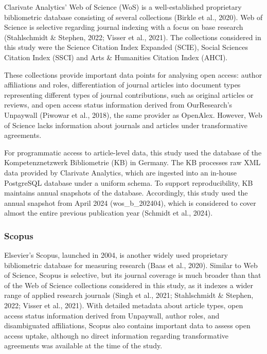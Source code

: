 \documentclass[a4paper,man,floatsintext,longtable,noextraspace,10pt]{apa6}
\begin{document}
Clarivate Analytics' Web of Science (WoS) is a well-established
proprietary bibliometric database consisting of several collections
(Birkle et al., 2020). Web of Science is selective regarding journal
indexing with a focus on base research (Stahlschmidt \& Stephen, 2022;
Visser et al., 2021). The collections considered in this study were the
Science Citation Index Expanded (SCIE), Social Sciences Citation Index
(SSCI) and Arts \& Humanities Citation Index (AHCI).

These collections provide important data points for analysing open
access: author affiliations and roles, differentiation of journal
articles into document types representing different types of journal
contributions, such as original articles or reviews, and open access
status information derived from OurResearch's Unpaywall (Piwowar et al.,
2018), the same provider as OpenAlex. However, Web of Science lacks
information about journals and articles under transformative agreements.

For programmatic access to article-level data, this study used the
database of the Kompetenznetzwerk Bibliometrie (KB) in Germany. The KB
processes raw XML data provided by Clarivate Analytics, which are
ingested into an in-house PostgreSQL database under a uniform schema. To
support reproducibility, KB maintains annual snapshots of the database.
Accordingly, this study used the annual snapshot from April 2024
(wos\_b\_202404), which is considered to cover almost the entire
previous publication year (Schmidt et al., 2024).

\subsubsection{Scopus}\label{scopus}

Elsevier's Scopus, launched in 2004, is another widely used proprietary
bibliometric database for measuring research (Baas et al., 2020).
Similar to Web of Science, Scopus is selective, but its journal coverage
is much broader than that of the Web of Science collections considered
in this study, as it indexes a wider range of applied research journals
(Singh et al., 2021; Stahlschmidt \& Stephen, 2022; Visser et al.,
2021). With detailed metadata about article types, open access status
information derived from Unpaywall, author roles, and disambiguated
affiliations, Scopus also contains important data to assess open access
uptake, although no direct information regarding transformative
agreements was available at the time of the study.
\end{document}
